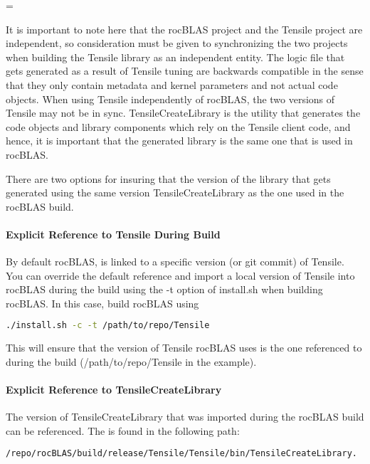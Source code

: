 \documentclass[]{article}
\newenvironment{warning}
{\par\begin{mdframed}[linewidth=2pt,linecolor=red]
		\begin{list}{}{\leftmargin=1cm
				\labelwidth=\leftmargin}\item[\Large\ding{43}]}
		{\end{list}\end{mdframed}\par}
\begin{document}
\begin{warning}
	It is important to note here that the rocBLAS project and the Tensile project are independent, so consideration must be given to synchronizing the two projects when building the Tensile library as an independent entity. The logic file that gets generated as a result of Tensile tuning are backwards compatible in the sense that they only contain metadata and kernel parameters and not actual code objects. When using Tensile independently of rocBLAS, the two versions of Tensile may not be in sync. TensileCreateLibrary is the utility that generates the code objects and library components which rely on the Tensile client code, and hence, it is important that the generated library is the same one that is used in rocBLAS.
\end{warning}

There are two options for insuring that the version of the library that gets generated using the same version TensileCreateLibrary as the one used in the rocBLAS build.

\paragraph{Explicit Reference to Tensile During Build}
By default rocBLAS, is linked to a specific version (or git commit) of Tensile. You can override the default reference and import a local version of Tensile into rocBLAS during the build using the -t option of install.sh when building rocBLAS. In this case, build rocBLAS using

\begin{lstlisting}[language=bash]
./install.sh -c -t /path/to/repo/Tensile
\end{lstlisting}

\noindent
This will ensure that the version of Tensile rocBLAS uses is the one referenced to during the build (/path/to/repo/Tensile in the example).

\paragraph{Explicit Reference to TensileCreateLibrary}

The version of TensileCreateLibrary that was imported during the rocBLAS build can be referenced. The is found in the following path:

\begin{lstlisting}[language=bash]
/repo/rocBLAS/build/release/Tensile/Tensile/bin/TensileCreateLibrary.
\end{lstlisting}
\end{document}
